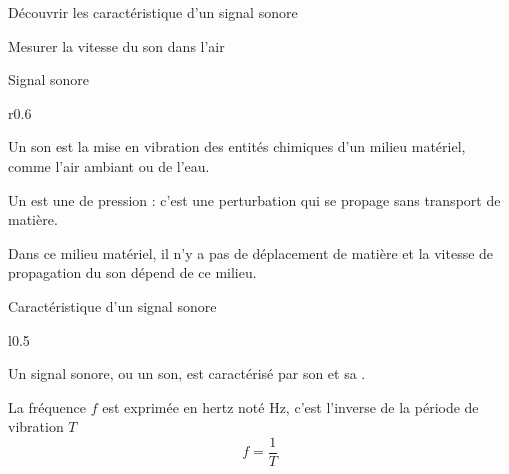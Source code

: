 \teteSndSign
{}
\vspace*{-24pt}

\begin{objectifs}
  \item Découvrir les caractéristique d'un signal sonore
  \item Mesurer la vitesse du son dans l'air
\end{objectifs}

\begin{doc}{Signal sonore}
  \begin{wrapfigure}[6]{r}{0.6\linewidth}
    \vspace*{-28pt}
    \begin{center}
    \end{center}
  \end{wrapfigure}

  Un son est la mise en vibration des entités chimiques d'un milieu matériel, comme l'air ambiant ou de l'eau. 
  \begin{importants}
    Un  est une  de pression : c'est une perturbation qui se propage sans transport de matière.
  \end{importants}
  Dans ce milieu matériel, il n'y a pas de déplacement de matière et la vitesse de propagation du son dépend de ce milieu.
\end{doc}


\begin{doc}{Caractéristique d'un signal sonore}
  \begin{wrapfigure}[3]{l}{0.5\linewidth}
    \vspace*{-18pt}
    \begin{center}
    \end{center}
  \end{wrapfigure}
  Un signal sonore, ou un son, est caractérisé par son  et sa .
  
  \begin{importants}
    La fréquence $f$ est exprimée en hertz noté \unit{\hertz}, c'est l'inverse de la période de vibration $T$
    \begin{equation*}
      f = \frac{1}{T}
    \end{equation*}
  \end{importants}
\end{doc}


